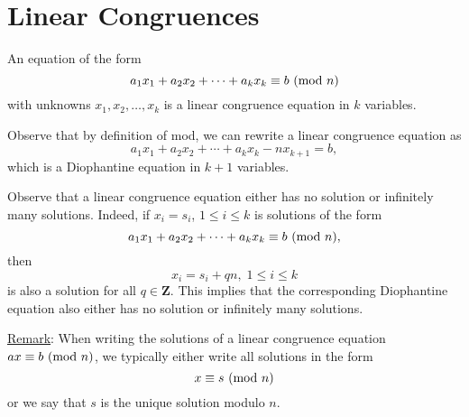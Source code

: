 \section{Linear Congruences}
\begin{Definition}{}{}
    An equation of the form
    \[ a_1x_1+a_2x_2+\cdots+a_k x_k\equiv b\ (\mathrm{mod}\ n) \]
    with unknowns $ x_1,x_2,\ldots,x_k $ is a linear congruence equation in $ k $ variables.
\end{Definition}
Observe that by definition of mod, we can rewrite a linear congruence equation as
\[ a_1x_1+a_2x_2+\cdots+a_k x_k-nx_{k+1}=b, \]
which is a Diophantine equation in $ k+1 $ variables.

Observe that a linear congruence equation either has no solution or infinitely many
solutions. Indeed, if $ x_i=s_i $, $ 1\le i\le k $ is solutions of the form
\[ a_1x_1+a_2x_2+\cdots+a_k x_k\equiv b\ (\mathrm{mod}\ n), \]
then
\[ x_i=s_i+qn,\; 1\le i\le k \]
is also a solution for all $ q\in\mathbf{Z} $. This implies that the corresponding Diophantine equation also either has no
solution or infinitely many solutions.

\underline{Remark}: When writing the solutions of a linear congruence equation $ ax\equiv b\ (\mathrm{mod}\ n) $,
we typically either write all solutions in the form
\[ x\equiv s\ (\mathrm{mod}\ n) \]
or we say that $ s $ is the unique solution modulo $ n $.

